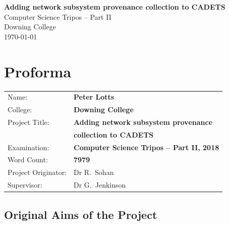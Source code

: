 \documentclass[a4paper,12pt,twoside,openright]{report}
\begin{document}
	
	
	
	\pagestyle{empty}
	
	
	\vspace*{60mm}
	\begin{center}
		\Huge
		\textbf{Adding network subsystem provenance collection to CADETS} \\[5mm]
		Computer Science Tripos -- Part II \\[5mm]
		Downing College \\[5mm]
		\today  %
	\end{center}
	
	
	\pagestyle{plain}
	
	\chapter*{Proforma}
	
	{\large
		\begin{tabular}{ll}
			Name:               & \bf Peter Lotts                       \\
			College:            & \bf Downing College                     \\
			Project Title:      & \bf Adding network subsystem provenance \\
								& \bf collection to CADETS \\
			Examination:        & \bf Computer Science Tripos -- Part II, 2018  \\
			Word Count:         & \bf 7979\footnotemark[1]  \\
			Project Originator: & Dr R.~Sohan                    \\
			Supervisor:         & Dr G.~Jenkinson                    \\ 
		\end{tabular}
	}
	
	
	\section*{Original Aims of the Project}
	
\end{document}
